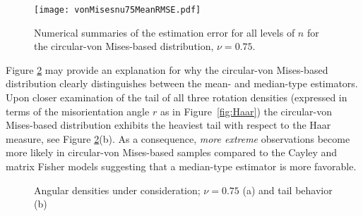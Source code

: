 \begin{figure}[h!]
\centering
\texttt{[image: vonMisesnu75MeanRMSE.pdf]}
\caption{Numerical summaries of the estimation error for all levels of $n$ for the circular-von Mises-based distribution,  $\nu=0.75$.  \label{fig:vmnu75}}
\end{figure}

\noindent Figure \ref{fig:dendetail} may provide an explanation for why the circular-von Mises-based distribution clearly distinguishes between the mean- and median-type estimators.  Upon closer examination of the tail of all three rotation densities (expressed in terms of the misorientation angle $r$ as in Figure~\ref{fig:Haar}) the circular-von Mises-based distribution exhibits the heaviest tail with respect to the Haar measure, see Figure \ref{fig:dendetail}(b). As a consequence, \textit{more extreme} observations become more likely in circular-von Mises-based samples compared to the Cayley and matrix Fisher models suggesting that a median-type estimator is more favorable. 

\begin{figure}[h!]
\centering
{}
\caption{Angular densities under consideration; $\nu=0.75$ (a) and tail behavior (b) }
\label{fig:dendetail}
\end{figure}

